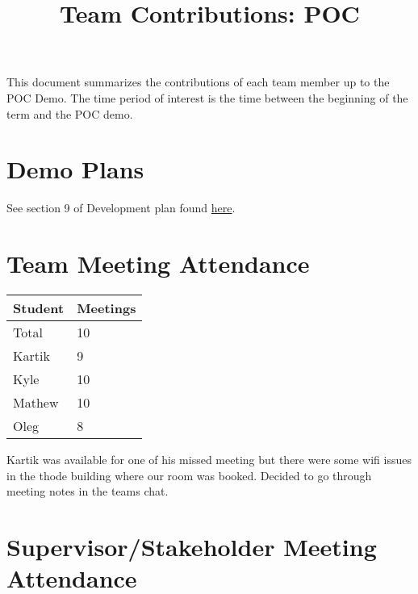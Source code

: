 \documentclass{article}
\title{Team Contributions: POC\\\progname}
\author{\authname}
\date{}
\begin{document}
\maketitle

This document summarizes the contributions of each team member up to the POC
Demo.  The time period of interest is the time between the beginning of the term
and the POC demo.

\section{Demo Plans}

See section 9 of Development plan found \href{https://github.com/OKKM-insights/OKKM.insights/blob/main/docs/DevelopmentPlan/DevelopmentPlan.pdf}{here}.


\section{Team Meeting Attendance}


\begin{table}[H]
\centering
\begin{tabular}{ll}
\toprule
\textbf{Student} & \textbf{Meetings}\\
\midrule
Total & 10\\
Kartik & 9\\
Kyle & 10\\
Mathew & 10\\
Oleg & 8\\
\bottomrule
\end{tabular}
\end{table}

Kartik was available for one of his missed meeting but there were some wifi issues in the thode building where our room was booked. Decided to go through meeting notes in the teams chat. \\

\section{Supervisor/Stakeholder Meeting Attendance}
\end{document}
